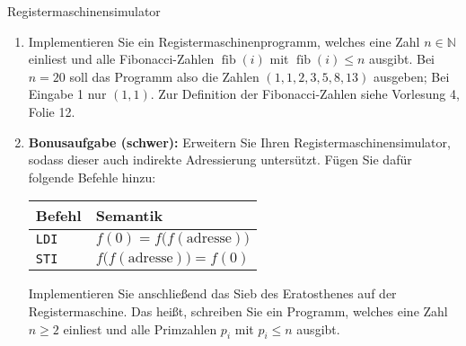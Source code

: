 \documentclass[11pt,a4paper]{article}
\begin{document}
\begin{aufgabe}{4}{Registermaschinensimulator}
\begin{enumerate}[label=\alph*)]
    \item Implementieren Sie ein Registermaschinenprogramm, welches eine Zahl $n \in \mathbb{N}$ einliest und alle Fibonacci-Zahlen $\operatorname{fib}(i)$ mit $\operatorname{fib}(i) \leq n$ ausgibt. Bei $n = 20$ soll das Programm also die Zahlen $(1, 1, 2, 3, 5, 8, 13)$ aus\-ge\-ben; Bei Eingabe 1 nur $(1, 1)$.
    Zur Definition der Fibonacci-Zahlen siehe Vorlesung 4, Folie 12.

    \item \textbf{Bonusaufgabe (schwer):} Erweitern Sie Ihren Registermaschinensimulator, sodass dieser auch indirekte Adressierung untersützt.
    Fügen Sie dafür folgende Befehle hinzu:
    \begin{table}[h!]
        \centering
        \begin{tabular}{|l|l|}
        \hline
        \textbf{Befehl} & \textbf{Semantik} \\ \hline
        \texttt{LDI} & $f(0) = f\big(f(\mathrm{adresse})\big)$ \\ \hline
        \texttt{STI} & $f\big(f(\mathrm{adresse})\big) = f(0)$ \\ \hline
        \end{tabular}
    \end{table}

    Implementieren Sie anschließend das Sieb des Eratosthenes auf der Registermaschine.
    Das heißt, schreiben Sie ein Programm, welches eine Zahl $n \geq 2$ einliest und alle Primzahlen $p_i$ mit $p_i \leq n$ ausgibt.
\end{enumerate}
\end{aufgabe}
\end{document}
